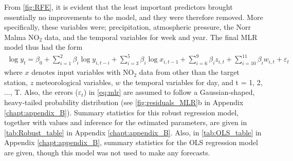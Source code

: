 \noindent
From \cref{fig:RFE}, it is evident that the least important predictors brought essentially no improvements to the model, and they were therefore removed. More specifically, these variables were; precipitation, atmospheric pressure, the Norr Malma NO$_2$ data, and the temporal variables for week and year. The final MLR model thus had the form
\begin{align}
\log y_t = \beta_0 + \sum_{i=1}^{2} \beta_{i} \log y_{i,t-i} + \sum_{i=3}^{5} \beta_{i} \log x_{i,t-1} + \sum_{i=6}^{9} \beta_{i} z_{i,t}  + \sum_{i=10}^{11} \beta_{i} w_{i,t} +  \varepsilon_t
\label{eq:mlr}
\end{align}
where $x$ denotes input variables with NO$_2$ data from other than the target station, $z$ meteorological variables, $w$ the temporal variables for day, and t = 1, 2, ..., T. Also, the errors ($\varepsilon_t$) in \cref{eq:mlr} are assumed to follow a Gaussian-shaped, heavy-tailed probability distribution (see \cref{fig:residuals_MLR}b in Appendix \ref{chapt:appendix_B}). Summary statistics for this robust regression model, together with values and inference for the estimated parameters, are given in \cref{tab:Robust_table} in Appendix \ref{chapt:appendix_B}. Also, in \cref{tab:OLS_table} in Appendix \ref{chapt:appendix_B}, summary statistics for the OLS regression model are given, though this model was not used to make any forecasts. \\




